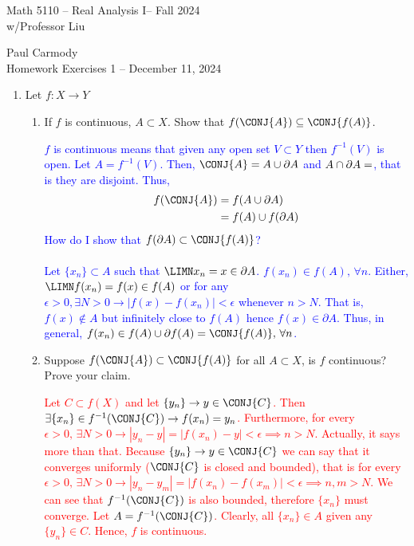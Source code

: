 \documentclass[10pt,a4paper]{report}
\newcommand{\CLASSNAME}{Math 5110 -- Real Analysis I}
\newcommand{\STUDENTNAME}{Paul Carmody}
\newcommand{\ASSIGNMENT}{Homework Exercises 1 }
\newcommand{\DUEDATE}{December 11, 2024}
\newcommand{\SEMESTER}{Fall 2024}
\newcommand{\RED}[1]{\textcolor{red}{#1}}
\newcommand{\BLUE}[1]{\textcolor{blue}{#1}}
\begin{document}
\begin{center}
	\Large{\CLASSNAME -- \SEMESTER} \\
	\large{ w/Professor Liu}
\end{center}
\begin{center}
	\STUDENTNAME \\
	\ASSIGNMENT -- \DUEDATE\\
\end{center} 

\newcommand{\VOL}{\text{ vol}}
\begin{enumerate}
\item Let $f: X \to Y$
\begin{enumerate}[label=(\alph*)]
	\item If $f$ is continuous, $A \subset X$.  Show that $f(\CONJ{A}) \subseteq \CONJ{f(A)}$.
	
	\BLUE{$f$ is continuous means that given any open set $V \subset Y$ then $f^{-1}(V)$ is open.  Let $A = f^{-1}(V)$.  Then, $\CONJ{A} = A \cup \partial A$ and $A \cap \partial A = \empty$, that is they are disjoint. Thus,
	\begin{align*}
		f(\CONJ{A}) &= f(A \cup \partial A) \\
		&= f(A) \cup f(\partial A)
\end{align*}	How do I show that $f(\partial A) \subset \CONJ{f(A)}$?\\
	\\
	Let $\{x_n\} \subset A$ such that $\LIMN x_n = x \in \partial A$.  $f(x_n) \in f(A),\, \forall n$.  Either, $\LIMN f(x_n) = f(x) \in f(A)$ or for any $\epsilon >0, \exists N>0 \to |f(x)-f(x_n)| < \epsilon$ whenever $n>N$.  That is, $f(x) \not \in A$ but infinitely close to $f(A)$ hence $f(x) \in \partial A$.  Thus, in general, $f(x_n) \in f(A) \cup \partial f(A) = \CONJ{f(A)}, \, \forall n$.
	}
	
	\item Suppose $f(\CONJ{A})\subset \CONJ{f(A)}$ for all $A \subset X$, is $f$ continuous?  Prove your claim.
	
	\RED{Let $C \subset f(X)$ and let $\{y_n\} \to y \in \CONJ{C}$.  Then $\exists \{x_n\}\in f^{-1}(\CONJ{C}) \to f(x_n) = y_n$.  Furthermore, for every $\epsilon > 0,\, \exists N>0 \to |y_n-y|=|f(x_n)-y|< \epsilon \implies n>N$.  Actually, it says more than that.  Because $\{y_n\} \to y \in \CONJ{C}$ we can say that it converges uniformly ($\CONJ{C}$ is closed and bounded), that is for every $\epsilon > 0,\, \exists N>0 \to |y_n-y_m|=|f(x_n)-f(x_m)|< \epsilon \implies n,m>N$.  We can see that $f^{-1}(\CONJ{C})$ is also bounded, therefore $\{x_n\}$ must converge.  Let $A =f^{-1}(\CONJ{C})$.  Clearly, all $\{x_n\}\in A$ given any $\{y_n\}\in C$.  Hence, $f$ is continuous.
	}
\end{enumerate}


\end{enumerate}
\end{document}
